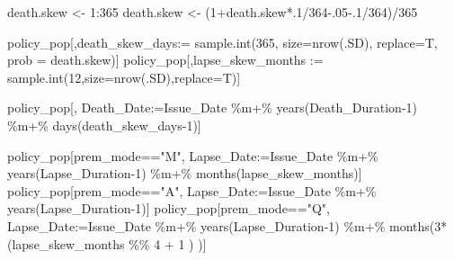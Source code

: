 \documentclass[
  letterpaper,
  DIV=11,
  numbers=noendperiod]{scrartcl}
\newenvironment{Shaded}{\begin{snugshade}}{\end{snugshade}}
\newcommand{\AttributeTok}[1]{\textcolor[rgb]{0.40,0.45,0.13}{#1}}
\newcommand{\DecValTok}[1]{\textcolor[rgb]{0.68,0.00,0.00}{#1}}
\newcommand{\ErrorTok}[1]{\textcolor[rgb]{0.68,0.00,0.00}{#1}}
\newcommand{\FloatTok}[1]{\textcolor[rgb]{0.68,0.00,0.00}{#1}}
\newcommand{\FunctionTok}[1]{\textcolor[rgb]{0.28,0.35,0.67}{#1}}
\newcommand{\NormalTok}[1]{\textcolor[rgb]{0.00,0.23,0.31}{#1}}
\newcommand{\OtherTok}[1]{\textcolor[rgb]{0.00,0.23,0.31}{#1}}
\newcommand{\SpecialCharTok}[1]{\textcolor[rgb]{0.37,0.37,0.37}{#1}}
\newcommand{\StringTok}[1]{\textcolor[rgb]{0.13,0.47,0.30}{#1}}
\begin{document}
\begin{Shaded}
\begin{Highlighting}[]
\NormalTok{death.skew }\OtherTok{\textless{}{-}} \DecValTok{1}\SpecialCharTok{:}\DecValTok{365}
\NormalTok{death.skew }\OtherTok{\textless{}{-}}\NormalTok{ (}\DecValTok{1}\SpecialCharTok{+}\NormalTok{death.skew}\SpecialCharTok{*}\NormalTok{.}\DecValTok{1}\SpecialCharTok{/}\DecValTok{364}\FloatTok{{-}.05{-}.1}\SpecialCharTok{/}\DecValTok{364}\NormalTok{)}\SpecialCharTok{/}\DecValTok{365}

\NormalTok{policy\_pop[,death\_skew\_days}\SpecialCharTok{:}\ErrorTok{=} \FunctionTok{sample.int}\NormalTok{(}\DecValTok{365}\NormalTok{,}
                                         \AttributeTok{size=}\FunctionTok{nrow}\NormalTok{(.SD),}
                                         \AttributeTok{replace=}\NormalTok{T,}
                                         \AttributeTok{prob =}\NormalTok{ death.skew)]}
\NormalTok{policy\_pop[,lapse\_skew\_months }\SpecialCharTok{:}\ErrorTok{=} \FunctionTok{sample.int}\NormalTok{(}\DecValTok{12}\NormalTok{,}\AttributeTok{size=}\FunctionTok{nrow}\NormalTok{(.SD),}\AttributeTok{replace=}\NormalTok{T)]}

\NormalTok{policy\_pop[,}
\NormalTok{           Death\_Date}\SpecialCharTok{:}\ErrorTok{=}\NormalTok{Issue\_Date }\SpecialCharTok{\%m+\%} \FunctionTok{years}\NormalTok{(Death\_Duration}\DecValTok{{-}1}\NormalTok{) }\SpecialCharTok{\%m+\%} 
             \FunctionTok{days}\NormalTok{(death\_skew\_days}\DecValTok{{-}1}\NormalTok{)]}

\NormalTok{policy\_pop[prem\_mode}\SpecialCharTok{==}\StringTok{"M"}\NormalTok{,}
\NormalTok{           Lapse\_Date}\SpecialCharTok{:}\ErrorTok{=}\NormalTok{Issue\_Date }\SpecialCharTok{\%m+\%} \FunctionTok{years}\NormalTok{(Lapse\_Duration}\DecValTok{{-}1}\NormalTok{) }\SpecialCharTok{\%m+\%} 
             \FunctionTok{months}\NormalTok{(lapse\_skew\_months)]}
\NormalTok{policy\_pop[prem\_mode}\SpecialCharTok{==}\StringTok{"A"}\NormalTok{,}
\NormalTok{           Lapse\_Date}\SpecialCharTok{:}\ErrorTok{=}\NormalTok{Issue\_Date }\SpecialCharTok{\%m+\%} \FunctionTok{years}\NormalTok{(Lapse\_Duration}\DecValTok{{-}1}\NormalTok{)]}
\NormalTok{policy\_pop[prem\_mode}\SpecialCharTok{==}\StringTok{"Q"}\NormalTok{,}
\NormalTok{           Lapse\_Date}\SpecialCharTok{:}\ErrorTok{=}\NormalTok{Issue\_Date }\SpecialCharTok{\%m+\%} \FunctionTok{years}\NormalTok{(Lapse\_Duration}\DecValTok{{-}1}\NormalTok{) }\SpecialCharTok{\%m+\%} 
             \FunctionTok{months}\NormalTok{(}\DecValTok{3}\SpecialCharTok{*}\NormalTok{(lapse\_skew\_months }\SpecialCharTok{\%\%} \DecValTok{4} \SpecialCharTok{+} \DecValTok{1}\NormalTok{ ) )]}


\end{Highlighting}
\end{Shaded}
\end{document}

